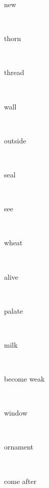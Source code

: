 \documentclass[a4paper]{article}
\begin{document}
\begin{multicols}{4}
\begin{multicols}{4}
\begin{multicols}{5}
{\hebrewfont{}} \begin{english}new\end{english}\\
{\hebrewfont{}} \begin{english}thorn\end{english}\\
{\hebrewfont{}} \begin{english}thread\end{english}\\
{\hebrewfont{}} \begin{english}wall\end{english}\\
{\hebrewfont{}} \begin{english}outside\end{english}\\
{\hebrewfont{}} \begin{english}seal\end{english}\\
{\hebrewfont{}} \begin{english}see\end{english}\\
{\hebrewfont{}} \begin{english}wheat\end{english}\\
{\hebrewfont{}} \begin{english}alive\end{english}\\
{\hebrewfont{}} \begin{english}palate\end{english}\\
{\hebrewfont{}} \begin{english}milk\end{english}\\
{\hebrewfont{}} \begin{english}become weak\end{english}\\
{\hebrewfont{}} \begin{english}window\end{english}\\
{\hebrewfont{}} \begin{english}ornament\end{english}\\
{\hebrewfont{}} \begin{english}come after\end{english}\\

\end{multicols}
\end{multicols}
\end{multicols}
\end{document}
